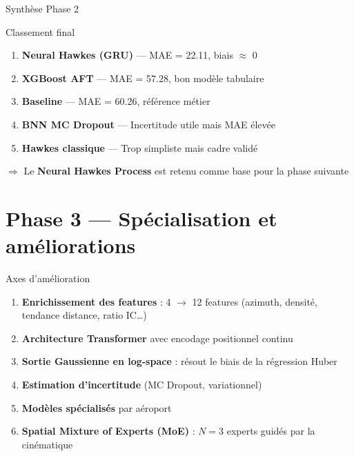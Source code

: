 \documentclass[aspectratio=169,10pt]{beamer}
\newcommand{\cmark}{\textcolor{meteoGreen}{\checkmark}}
\begin{document}
\begin{frame}{Synthèse Phase 2}
\begin{block}{Classement final}
\begin{enumerate}
  \item \textbf{Neural Hawkes (GRU)} — MAE = 22.11, biais $\approx$ 0 \cmark
  \item \textbf{XGBoost AFT} — MAE = 57.28, bon modèle tabulaire
  \item \textbf{Baseline} — MAE = 60.26, référence métier
  \item \textbf{BNN MC Dropout} — Incertitude utile mais MAE élevée
  \item \textbf{Hawkes classique} — Trop simpliste mais cadre validé
\end{enumerate}
\end{block}

\vspace{0.5em}
\centering
$\Rightarrow$ Le \textbf{Neural Hawkes Process} est retenu comme base pour la phase suivante
\end{frame}


\section{Phase 3 — Spécialisation et améliorations}


\begin{frame}{Axes d'amélioration}
\begin{enumerate}
  \item \textbf{Enrichissement des features} : 4 $\to$ 12 features (azimuth, densité, tendance distance, ratio IC\ldots)
  \item \textbf{Architecture Transformer} avec encodage positionnel continu
  \item \textbf{Sortie Gaussienne en log-space} : résout le biais de la régression Huber
  \item \textbf{Estimation d'incertitude} (MC Dropout, variationnel)
  \item \textbf{Modèles spécialisés} par aéroport
  \item \textbf{Spatial Mixture of Experts (MoE)} : $N=3$ experts guidés par la cinématique
\end{enumerate}
\end{frame}
\end{document}
